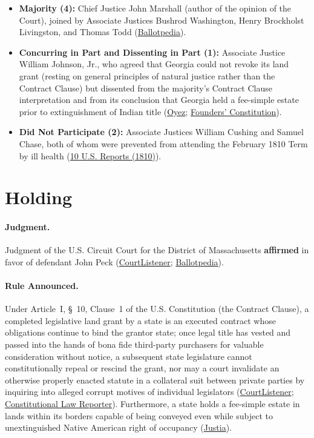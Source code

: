 \documentclass[12pt]{article}
\begin{document}
\begin{itemize}
\item \textbf{Majority (4):} Chief Justice John Marshall (author of the opinion of the Court), joined by Associate Justices Bushrod Washington, Henry Brockholst Livingston, and Thomas Todd (\href{https://ballotpedia.org/Fletcher_v._Peck}{Ballotpedia}).
\item \textbf{Concurring in Part and Dissenting in Part (1):} Associate Justice William Johnson, Jr., who agreed that Georgia could not revoke its land grant (resting on general principles of natural justice rather than the Contract Clause) but dissented from the majority's Contract Clause interpretation and from its conclusion that Georgia held a fee-simple estate prior to extinguishment of Indian title (\href{https://www.oyez.org/cases/1789-1850/10us87}{Oyez}; \href{https://press-pubs.uchicago.edu/founders/documents/a1_10_1s12.html}{Founders' Constitution}).
\item \textbf{Did Not Participate (2):} Associate Justices William Cushing and Samuel Chase, both of whom were prevented from attending the February 1810 Term by ill health (\href{https://www.supremecourt.gov/pdfs/USReports/USREPORTS-10_PDFA.pdf}{10 U.S. Reports (1810)}).
\end{itemize}

\section{Holding}

\paragraph{Judgment.}
Judgment of the U.S. Circuit Court for the District of Massachusetts \textbf{affirmed} in favor of defendant John Peck (\href{https://www.courtlistener.com/opinion/84935/fletcher-v-peck/}{CourtListener}; \href{https://ballotpedia.org/Fletcher_v._Peck}{Ballotpedia}).

\paragraph{Rule Announced.}
Under Article~I, \S~10, Clause~1 of the U.S. Constitution (the Contract Clause), a completed legislative land grant by a state is an executed contract whose obligations continue to bind the grantor state; once legal title has vested and passed into the hands of bona fide third-party purchasers for valuable consideration without notice, a subsequent state legislature cannot constitutionally repeal or rescind the grant, nor may a court invalidate an otherwise properly enacted statute in a collateral suit between private parties by inquiring into alleged corrupt motives of individual legislators (\href{https://www.courtlistener.com/opinion/84935/fletcher-v-peck/}{CourtListener}; \href{https://constitutionallawreporter.com/2015/06/16/fletcher-v-peck-contract-clause/}{Constitutional Law Reporter}). Furthermore, a state holds a fee-simple estate in lands within its borders capable of being conveyed even while subject to unextinguished Native American right of occupancy (\href{https://supreme.justia.com/cases/federal/us/10/87/}{Justia}).
\end{document}
